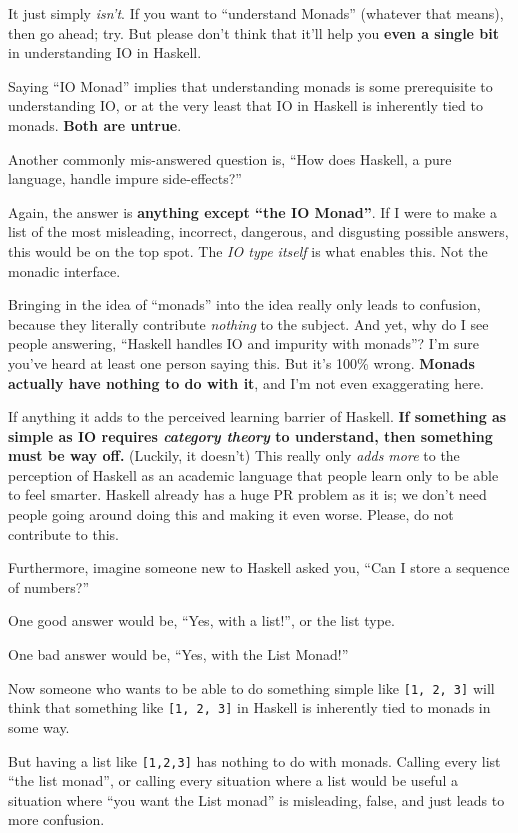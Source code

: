 \documentclass[]{article}
\begin{document}
It just simply \emph{isn't}. If you want to ``understand Monads'' (whatever that
means), then go ahead; try. But please don't think that it'll help you
\textbf{even a single bit} in understanding IO in Haskell.

Saying ``IO Monad'' implies that understanding monads is some prerequisite to
understanding IO, or at the very least that IO in Haskell is inherently tied to
monads. \textbf{Both are untrue}.

Another commonly mis-answered question is, ``How does Haskell, a pure language,
handle impure side-effects?''

Again, the answer is \textbf{anything except ``the IO Monad''}. If I were to
make a list of the most misleading, incorrect, dangerous, and disgusting
possible answers, this would be on the top spot. The \emph{IO type itself} is
what enables this. Not the monadic interface.

Bringing in the idea of ``monads'' into the idea really only leads to confusion,
because they literally contribute \emph{nothing} to the subject. And yet, why do
I see people answering, ``Haskell handles IO and impurity with monads''? I'm
sure you've heard at least one person saying this. But it's 100\% wrong.
\textbf{Monads actually have nothing to do with it}, and I'm not even
exaggerating here.

If anything it adds to the perceived learning barrier of Haskell. \textbf{If
something as simple as IO requires \emph{category theory} to understand, then
something must be way off.} (Luckily, it doesn't) This really only \emph{adds
more} to the perception of Haskell as an academic language that people learn
only to be able to feel smarter. Haskell already has a huge PR problem as it is;
we don't need people going around doing this and making it even worse. Please,
do not contribute to this.

Furthermore, imagine someone new to Haskell asked you, ``Can I store a sequence
of numbers?''

One good answer would be, ``Yes, with a list!'', or the list type.

One bad answer would be, ``Yes, with the List Monad!''

Now someone who wants to be able to do something simple like
\texttt{{[}1,\ 2,\ 3{]}} will think that something like \texttt{{[}1,\ 2,\ 3{]}}
in Haskell is inherently tied to monads in some way.

But having a list like \texttt{{[}1,2,3{]}} has nothing to do with monads.
Calling every list ``the list monad'', or calling every situation where a list
would be useful a situation where ``you want the List monad'' is misleading,
false, and just leads to more confusion.
\end{document}
